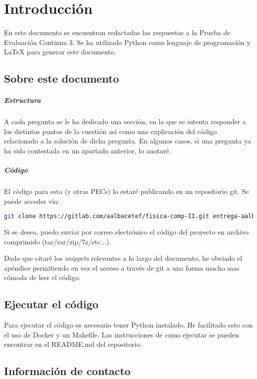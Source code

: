 %
%

\section{Introducción}

\paragraph{}
En este documento se encuentran redactadas las respuestas a la Prueba de Evaluación Continua 3. Se ha utilizado Python como lenguaje de programación y LaTeX para generar este documento.

\subsection{Sobre este documento}

\subparagraph{Estructura}
A cada pregunta se le ha dedicado una sección, en la que se intenta responder a los distintos puntos de la cuestión así como una explicación del código relacionado a la solución de dicha pregunta. En algunos casos, si una pregunta ya ha sido contestada en un apartado anterior, lo anotaré. 

\subparagraph{Código}
El código para esta (y otras PECs) lo estaré publicando en un repositorio git. Se puede acceder via:

\begin{lstlisting}[language=bash]
	git clone https://gitlab.com/aalbacetef/fisica-comp-II.git entrega-aalbacetef-fc-ii
\end{lstlisting}


Si se desea, puedo enviar por correo electrónico el código del proyecto en archivo comprimido (tar/rar/zip/7z/etc...).

Dado que citaré los \textit{snippets} relevantes a lo largo del documento, he obviado el apéndice permitiendo en vez el acceso a través de git a una forma mucho mas cómoda de leer el código.


\subsection{Ejecutar el código}

Para ejecutar el código es necesario tener Python instalado. He facilitado esto con el uso de Docker y un Makefile. Las instrucciones de como ejecutar se pueden encontrar en el README.md del repositorio.

\subsection{Información de contacto}

